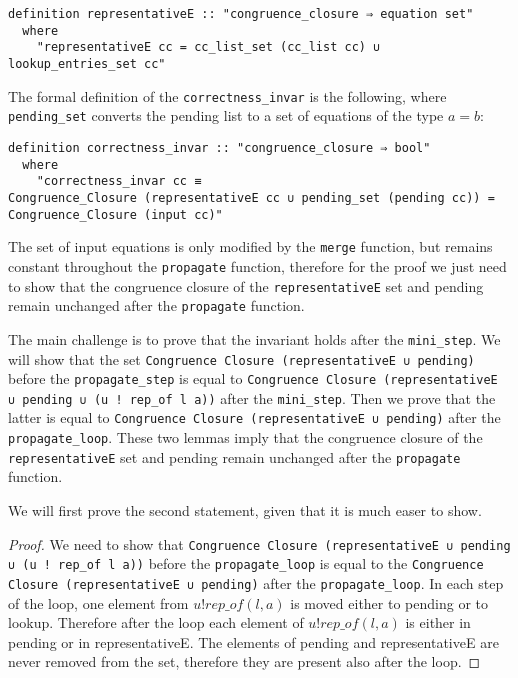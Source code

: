 \begin{lstlisting}
definition representativeE :: "congruence_closure ⇒ equation set"
  where
    "representativeE cc = cc_list_set (cc_list cc) ∪ lookup_entries_set cc"
\end{lstlisting}

The formal definition of the \lstinline|correctness_invar| is the following, where \lstinline{pending_set} converts the pending list to a set of equations of the type $a = b$:

\begin{lstlisting}
definition correctness_invar :: "congruence_closure ⇒ bool"
  where
    "correctness_invar cc ≡
Congruence_Closure (representativeE cc ∪ pending_set (pending cc)) = Congruence_Closure (input cc)"
\end{lstlisting}

The set of input equations is only modified by the \lstinline{merge} function, but remains constant throughout the \lstinline{propagate} function, therefore for the proof we just need to show that the congruence closure of the \lstinline{representativeE} set and pending remain unchanged after the \lstinline{propagate} function.

The main challenge is to prove that the invariant holds after the \lstinline{mini_step}. We will show that the set \lstinline{Congruence Closure (representativeE ∪ pending)} before the \lstinline{propagate_step} is equal to \lstinline{Congruence Closure (representativeE ∪ pending ∪ (u ! rep_of l a))} after the \lstinline{mini_step}.
Then we prove that the latter is equal to \lstinline{Congruence Closure (representativeE ∪ pending)}  after the \lstinline{propagate_loop}.
These two lemmas imply that the congruence closure of the \lstinline{representativeE} set and pending remain unchanged after the \lstinline{propagate} function.

We will first prove the second statement, given that it is much easer to show.

\begin{proof}
We need to show that
\lstinline{Congruence Closure (representativeE ∪ pending ∪ (u ! rep_of l a))}
before the
\lstinline{propagate_loop} is equal to the
\lstinline{Congruence Closure (representativeE ∪ pending)}  after the \lstinline{propagate_loop}. In each step of the loop, one element from $u ! rep\_of(l, a)$ is moved either to pending or to lookup. Therefore after the loop each element of $u ! rep\_of(l, a)$ is either in pending or in representativeE. The elements of pending and representativeE are never removed from the set, therefore they are present also after the loop.
\end{proof}

